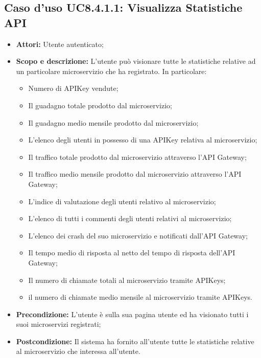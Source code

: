 \documentclass[12pt,a4paper,titlepage]{article}
\begin{document}
	\subsection{Caso d'uso UC8.4.1.1: Visualizza Statistiche API}
	\label{UC8.4.1.1}
	\begin{itemize}
		\item \textbf{Attori: }Utente autenticato;
		\item \textbf{Scopo e descrizione: }L'utente può visionare tutte le statistiche relative ad un particolare microservizio che ha registrato. In particolare:
		\begin{itemize}
			\item Numero di APIKey vendute;
			\item Il guadagno totale prodotto dal microservizio;
			\item Il guadagno medio mensile prodotto dal microservizio;
			\item L'elenco degli utenti in possesso di una APIKey relativa al microservizio;
			\item Il traffico totale prodotto dal microservizio attraverso l'API Gateway;
			\item Il traffico medio mensile prodotto dal microservizio attraverso l'API Gateway;
			\item L'indice di valutazione degli utenti relativo al microservizio;
			\item L'elenco di tutti i commenti degli utenti relativi al microservizio;
			\item L'elenco dei crash del suo microservizio e notificati dall'API Gateway;
			\item Il tempo medio di risposta al netto del tempo di risposta dell'API Gateway;
			\item Il numero di chiamate totali al microservizio tramite APIKeys;
			\item il numero di chiamate medio mensile al microservizio tramite APIKeys.
		\end{itemize}
		\item \textbf{Precondizione: }L'utente è sulla sua pagina utente ed ha visionato tutti i suoi microservizi registrati;
		\item \textbf{Postcondizione: }Il sistema ha fornito all'utente tutte le statistiche relative al microservizio che interessa all'utente.
	\end{itemize}
\end{document}
